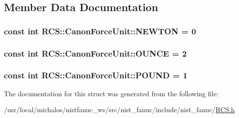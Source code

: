 \subsection{Member Data Documentation}
\hypertarget{structRCS_1_1CanonForceUnit_ae8e79a912a37f8a9db6032d19ccc287c}{
\subsubsection[{N\-E\-W\-T\-O\-N}]{\setlength{\rightskip}{0pt plus 5cm}const int R\-C\-S\-::\-Canon\-Force\-Unit\-::\-N\-E\-W\-T\-O\-N = 0\hspace{0.3cm}{\ttfamily [static]}}}\label{structRCS_1_1CanonForceUnit_ae8e79a912a37f8a9db6032d19ccc287c}
\hypertarget{structRCS_1_1CanonForceUnit_a87cc19b98cb94276d9ee6372ddd128d4}{
\subsubsection[{O\-U\-N\-C\-E}]{\setlength{\rightskip}{0pt plus 5cm}const int R\-C\-S\-::\-Canon\-Force\-Unit\-::\-O\-U\-N\-C\-E = 2\hspace{0.3cm}{\ttfamily [static]}}}\label{structRCS_1_1CanonForceUnit_a87cc19b98cb94276d9ee6372ddd128d4}
\hypertarget{structRCS_1_1CanonForceUnit_aad5ded62a2efda9b07cab8ceabf9fbda}{
\subsubsection[{P\-O\-U\-N\-D}]{\setlength{\rightskip}{0pt plus 5cm}const int R\-C\-S\-::\-Canon\-Force\-Unit\-::\-P\-O\-U\-N\-D = 1\hspace{0.3cm}{\ttfamily [static]}}}\label{structRCS_1_1CanonForceUnit_aad5ded62a2efda9b07cab8ceabf9fbda}


The documentation for this struct was generated from the following file\-:\begin{DoxyCompactItemize}
\item 
/usr/local/michalos/nistfanuc\-\_\-ws/src/nist\-\_\-fanuc/include/nist\-\_\-fanuc/\hyperlink{RCS_8h}{R\-C\-S.\-h}\end{DoxyCompactItemize}
